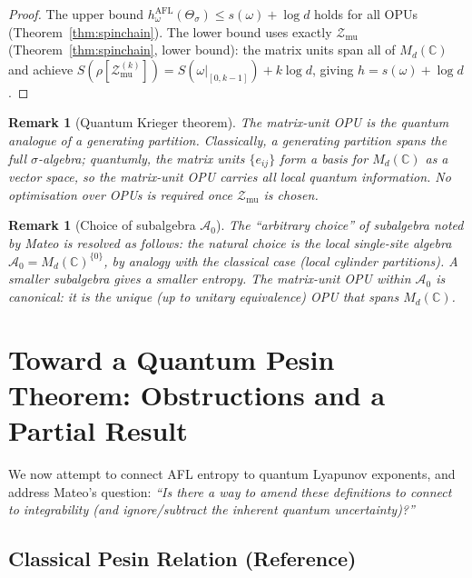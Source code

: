 \documentclass[12pt,a4paper]{article}
\newtheorem{remark}[theorem]{Remark}
\newcommand{\A}{\mathcal{A}}
\begin{document}
\begin{proof}
The upper bound $h_\omega^{\mathrm{AFL}}(\Theta_\sigma)\leq s(\omega)+\log d$ holds for
all OPUs (Theorem~\ref{thm:spinchain}).  The lower bound uses exactly
$\mathcal{Z}_{\mathrm{mu}}$ (Theorem~\ref{thm:spinchain}, lower bound): the matrix
units span all of $M_d(\mathbb{C})$ and achieve $S(\rho[\mathcal{Z}_{\mathrm{mu}}^{(k)}])
= S(\omega|_{[0,k-1]})+k\log d$, giving $h = s(\omega)+\log d$.
\end{proof}

\begin{remark}[Quantum Krieger theorem]
The matrix-unit OPU is the quantum analogue of a generating partition.  Classically,
a generating partition spans the full $\sigma$-algebra; quantumly, the matrix units
$\{e_{ij}\}$ form a basis for $M_d(\mathbb{C})$ as a vector space, so the matrix-unit
OPU carries \emph{all} local quantum information.  No optimisation over OPUs is required
once $\mathcal{Z}_{\mathrm{mu}}$ is chosen.
\end{remark}

\begin{remark}[Choice of subalgebra $\A_0$]
The ``arbitrary choice'' of subalgebra noted by Mateo is resolved as follows: the
natural choice is the local single-site algebra $\A_0=M_d(\mathbb{C})^{\{0\}}$, by
analogy with the classical case (local cylinder partitions).  A smaller subalgebra
gives a smaller entropy.  The matrix-unit OPU within $\A_0$ is canonical: it is the
unique (up to unitary equivalence) OPU that spans $M_d(\mathbb{C})$.
\end{remark}

\section{Toward a Quantum Pesin Theorem: Obstructions and a Partial Result}
\label{sec:pesin_attempt}

We now attempt to connect AFL entropy to quantum Lyapunov exponents, and address
Mateo's question: \emph{``Is there a way to amend these definitions to connect to
integrability (and ignore/subtract the inherent quantum uncertainty)?''}

\subsection{Classical Pesin Relation (Reference)}
\end{document}
